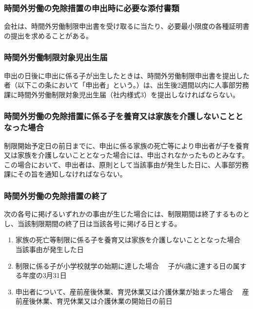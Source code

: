 \documentclass{jsarticle}
\begin{document}
\subsubsection{時間外労働の免除措置の申出時に必要な添付書類}
\label{育介_項_時間外労働の免除措置の申出時に必要な添付書類}
会社は、時間外労働制限申出書を受け取るに当たり、必要最小限度の各種証明書の提出を求めることがある。 

\subsubsection{時間外労働制限対象児出生届}
\label{育介_項_時間外労働制限対象児出生届}
申出の日後に申出に係る子が出生したときは、時間外労働制限申出書を提出した者（以下この条において「申出者」という。）は、出生後2週間以内に人事部労務課に時間外労働制限対象児出生届（社内様式3）を提出しなければならない。 

\subsubsection{時間外労働の免除措置に係る子を養育又は家族を介護しないこととなった場合}
\label{育介_項_時間外労働の免除措置に係る子を養育又は家族を介護しないこととなった場合}
制限開始予定日の前日までに、申出に係る家族の死亡等により申出者が子を養育又は家族を介護しないこととなった場合には、申出されなかったものとみなす。この場合において、申出者は、原則として当該事由が発生した日に、人事部労務課にその旨を通知しなければならない。

\subsubsection{時間外労働の免除措置の終了}
\label{育介_項_時間外労働の免除措置の終了}
次の各号に掲げるいずれかの事由が生じた場合には、制限期間は終了するものとし、当該制限期間の終了日は当該各号に掲げる日とする。 
\begin{enumerate}
  \item 家族の死亡等制限に係る子を養育又は家族を介護しないこととなった場合\label{enum:育介_項_時間外労働の免除措置の終了_子・家族の死亡等}
        　当該事由が発生した日 
  \item 制限に係る子が小学校就学の始期に達した場合
        　子が6歳に達する日の属する年度の3月31日 
  \item 申出者について、産前産後休業、育児休業又は介護休業が始まった場合
        　産前産後休業、育児休業又は介護休業の開始日の前日 
\end{enumerate}
\end{document}
